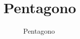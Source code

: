 \section{Pentagono}
\begin{figure}
	\centering
	
	\caption{Pentagono}
	\label{fig:pentagono1}
\end{figure}
